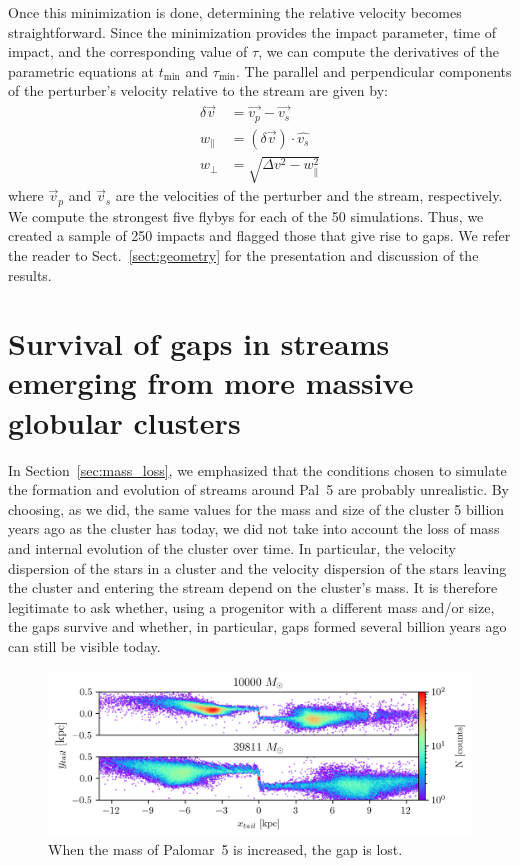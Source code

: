\documentclass{aa}
\begin{document}
\begin{appendix}
      Once this minimization is done, determining the relative velocity becomes straightforward. Since the minimization provides the impact parameter, time of impact, and the corresponding value of $\tau$, we can compute the derivatives of the parametric equations at $t_{\text{min}}$ and $\tau_{\text{min}}$. The parallel and perpendicular components of the perturber's velocity relative to the stream are given by:
      \begin{equation}
        \begin{aligned}
          \delta \vec{v} &=\vec{v_p} - \vec{v_s} \\
          w_\parallel &= \left(\delta \vec{v}\right)\cdot \hat{v_s}\\  
          w_\perp &=  \sqrt{\Delta v ^2 - w_\parallel ^ 2}
          \end{aligned}
        \end{equation}
      where $\vec{v}_p$ and $\vec{v}_s$ are the velocities of the perturber and the stream, respectively. We compute the strongest five flybys for each of the 50 simulations. Thus, we created a sample of 250 impacts and flagged those that give rise to gaps. We refer the reader to Sect.~\ref{sect:geometry} for the presentation and discussion of the results.



\section{Survival of gaps in streams emerging from more massive globular clusters}\label{sec:gaps_vs_gcmass}

    In Section~\ref{sec:mass_loss}, we emphasized that the conditions chosen to simulate the formation and evolution of streams around Pal~5 are probably unrealistic. By choosing, as we did, the same values for the mass and size of the cluster 5 billion years ago as the cluster has today, we did not take into account the loss of mass and internal evolution of the cluster over time. In particular, the velocity dispersion of the stars in a cluster and the velocity dispersion of the stars leaving the cluster and entering the stream depend on the cluster's mass. It is therefore legitimate to ask whether, using a progenitor with a different mass and/or size, the gaps survive and whether, in particular, gaps formed several billion years ago can still be visible today. 

  \begin{figure}
      \centering
      \includegraphics[width=1\linewidth]{gap_no_more.png}
      \caption{When the mass of Palomar~5 is increased, the gap is lost.}
      \label{fig:gap_no_more}
  \end{figure}


\end{appendix}
\end{document}
